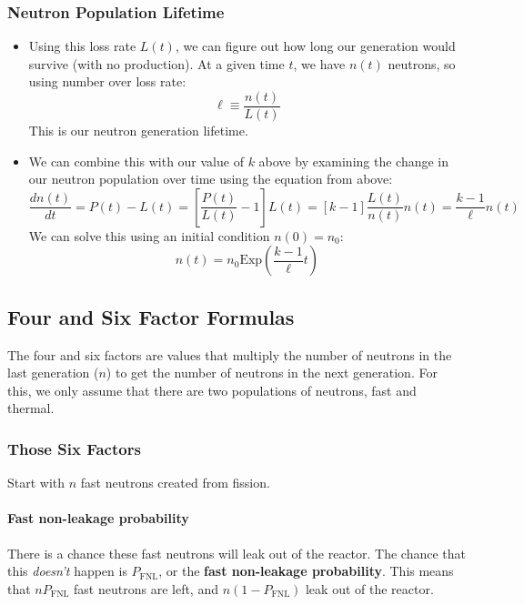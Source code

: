\documentclass[letter]{article}
\begin{document}
\subsubsection{Neutron Population Lifetime}
\begin{itemize}
\item Using this loss rate $L(t)$, we can figure out how long our
  generation would survive (with no production). At a given time $t$,
  we have $n(t)$ neutrons, so using number over loss rate:
  \begin{equation*}
    \ell \equiv \frac{n(t)}{L(t)}
  \end{equation*}
This is our neutron generation lifetime.\cite[Lec 10.]{lecture}
\item We can combine this with our value of $k$ above by examining the
  change in our neutron population over time using the equation from above:
  \begin{equation*}
    \frac{dn(t)}{dt}=P(t)-L(t)=\left[\frac{P(t)}{L(t)}-1\right]L(t)=[k-1]\frac{L(t)}{n(t)}n(t)=\frac{k-1}{\ell}n(t)
  \end{equation*}
We can solve this using an initial condition $n(0)=n_0$:
\begin{equation*}
  n(t)=n_0\text{Exp}\left(\frac{k-1}{\ell}t\right)
\end{equation*}
\end{itemize}

\subsection{Four and Six Factor Formulas}
The four and six factors are values that multiply the number of
neutrons in the last generation ($n$) to get the number of neutrons in the
next generation. For this, we only assume that there are two
populations of neutrons, fast and thermal.

\subsubsection{Those Six Factors}

Start with $n$ fast neutrons created from fission.

\paragraph{Fast non-leakage probability}
There is a chance these fast neutrons will leak out of the
  reactor. The chance that this \textit{doesn't} happen is
  $P_{\text{FNL}}$, or the \textbf{fast non-leakage probability}. This
  means that $nP_{\text{FNL}}$ fast neutrons are left, and
  $n(1-P_{\text{FNL}})$ leak out of the reactor.
\end{document}
